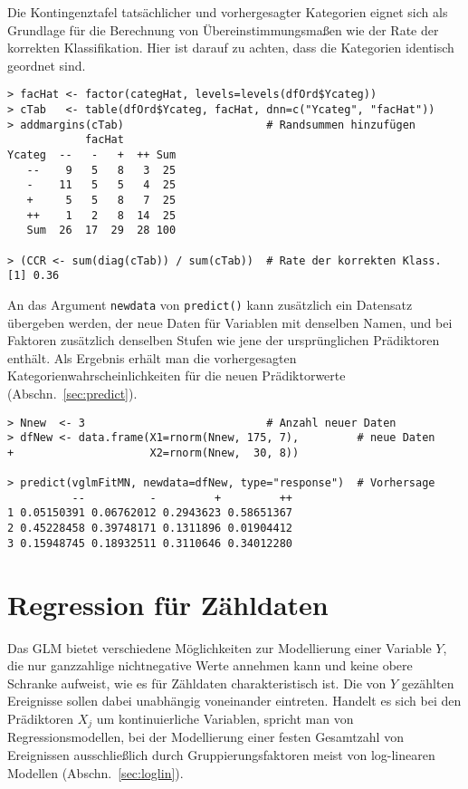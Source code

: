 Die Kontingenztafel tatsächlicher und vorhergesagter Kategorien eignet sich als Grundlage für die Berechnung von Übereinstimmungsmaßen wie der Rate der korrekten Klassifikation. Hier ist darauf zu achten, dass die Kategorien identisch geordnet sind.
\begin{lstlisting}
> facHat <- factor(categHat, levels=levels(dfOrd$Ycateg))
> cTab   <- table(dfOrd$Ycateg, facHat, dnn=c("Ycateg", "facHat"))
> addmargins(cTab)                      # Randsummen hinzufügen
            facHat
Ycateg  --   -   +  ++ Sum
   --    9   5   8   3  25
   -    11   5   5   4  25
   +     5   5   8   7  25
   ++    1   2   8  14  25
   Sum  26  17  29  28 100

> (CCR <- sum(diag(cTab)) / sum(cTab))  # Rate der korrekten Klass.
[1] 0.36
\end{lstlisting}

An das Argument \lstinline!newdata! von \lstinline!predict()! kann zusätzlich ein Datensatz übergeben werden, der neue Daten für Variablen mit denselben Namen, und bei Faktoren zusätzlich denselben Stufen wie jene der ursprünglichen Prädiktoren enthält. Als Ergebnis erhält man die vorhergesagten Kategorienwahrscheinlichkeiten für die neuen Prädiktorwerte (Abschn.\ \ref{sec:predict}).
\begin{lstlisting}
> Nnew  <- 3                            # Anzahl neuer Daten
> dfNew <- data.frame(X1=rnorm(Nnew, 175, 7),         # neue Daten
+                     X2=rnorm(Nnew,  30, 8))

> predict(vglmFitMN, newdata=dfNew, type="response")  # Vorhersage
          --          -         +         ++
1 0.05150391 0.06762012 0.2943623 0.58651367
2 0.45228458 0.39748171 0.1311896 0.01904412
3 0.15948745 0.18932511 0.3110646 0.34012280
\end{lstlisting}

\section{Regression für Zähldaten}
\label{sec:regrCount}

Das GLM bietet verschiedene Möglichkeiten zur Modellierung einer Variable $Y$, die nur ganzzahlige nichtnegative Werte annehmen kann und keine obere Schranke aufweist, wie es für Zähldaten charakteristisch ist. Die von $Y$ gezählten Ereignisse sollen dabei unabhängig voneinander eintreten. Handelt es sich bei den Prädiktoren $X_{j}$ um kontinuierliche Variablen, spricht man von Regressionsmodellen, bei der Modellierung einer festen Gesamtzahl von Ereignissen ausschließlich durch Gruppierungsfaktoren meist von log-linearen Modellen (Abschn.\ \ref{sec:loglin}).

